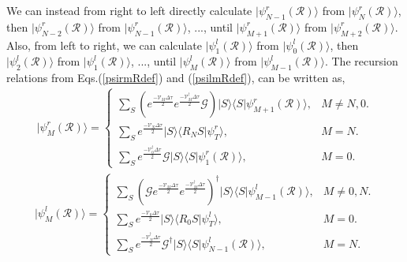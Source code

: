 \documentclass[12pt,letterpaper,UTF8]{report}
\begin{document}
We can instead from right to left directly calculate $| \psi^r_{N-1} (\mathcal{R}) \rangle $ from $| \psi^r_N (\mathcal{R}) \rangle $, then $| \psi^r_{N-2} (\mathcal{R}) \rangle $ from $| \psi^r_{N-1} (\mathcal{R}) \rangle $, ..., until $| \psi^r_{M+1} (\mathcal{R}) \rangle $ from $| \psi^r_{M+2} (\mathcal{R}) \rangle $.
Also, from left to right, we can calculate $| \psi^l_{1} (\mathcal{R}) \rangle $ from $| \psi^l_0 (\mathcal{R}) \rangle $, then $| \psi^l_{2} (\mathcal{R}) \rangle $ from $| \psi^l_{1} (\mathcal{R}) \rangle $, ..., until $| \psi^l_{M} (\mathcal{R}) \rangle $ from $| \psi^l_{M-1} (\mathcal{R}) \rangle $.
The recursion relations from Eqs.(\ref{psirmRdef}) and (\ref{psilmRdef}), can be written as,
\begin{eqnarray}
 | \psi^r_M (\mathcal{R}) \rangle  =
\begin{cases}
 \sum\limits_{S}
 \left(  e^{\frac{- \mathcal{V}_M  \Delta \tau }{2}}  e^{\frac{- \mathcal{V}^\dagger_M  \Delta \tau }{2}}
\bm{\mathcal{G}} \right) | S \rangle
\langle S| \psi^r_{M+1} (\mathcal{R}) \rangle,
 & M \neq  N,  0. \\
 \sum\limits_{S}
e^{\frac{- \mathcal{V}_N  \Delta \tau }{2}}
| S \rangle \langle R_N  S | \psi^r_T \rangle,
 &  M = N. \\
  \sum\limits_{S} \! e^{\frac{- \mathcal{V}^\dagger_0  \Delta \tau }{2}} \bm{\mathcal{G}}
  | S \rangle \langle S | \psi^r_1 (\mathcal{R}) \rangle,
 &  M =0.
\end{cases} \label{phirMRrecur}
\end{eqnarray}
\begin{eqnarray}
| \psi^l_M (\mathcal{R})\rangle  =
\begin{cases}
 \sum\limits_{S}
\left( \bm{\mathcal{G}}   e^{\frac{- \mathcal{V}_M  \Delta \tau }{2}}  e^{\frac{- \mathcal{V}^\dagger_M  \Delta \tau }{2}}
 \right)^\dagger | S \rangle
\langle S | \psi^l_{M-1} (\mathcal{R}) \rangle,
 & M\neq 0,N. \\
 \sum\limits_{S}
e^{\frac{- \mathcal{V}_{0}  \Delta \tau }{2}}   | S \rangle \langle R_0  S | \psi^l_T \rangle,
 &  M=0. \\
 \sum\limits_{S}\!   e^{\frac{- \mathcal{V}^\dagger_{N}  \Delta \tau }{2}} \bm{\mathcal{G}}^\dagger | S \rangle
\langle S | \psi^l_{N-1} (\mathcal{R}) \rangle,
 &  M=N.
\end{cases} \label{philMRrecur}
\end{eqnarray}
\end{document}

